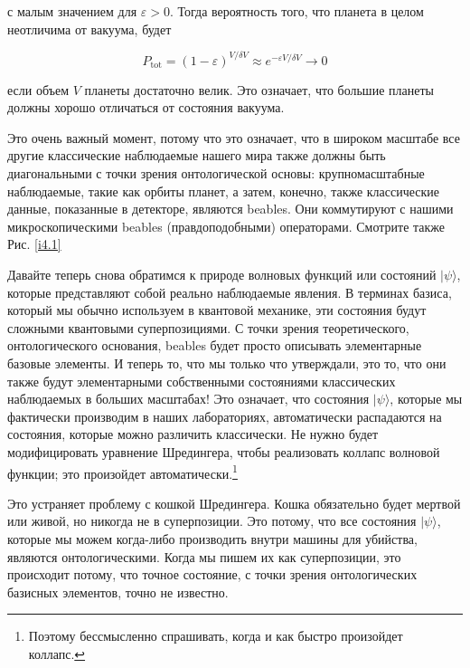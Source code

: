\documentclass[main.tex]{subfiles}
\begin{document}
с малым значением для $\varepsilon > 0$. Тогда вероятность того, что планета в целом неотличима от вакуума, будет

\begin{equation}\label{4.2}
	P_{\mathrm{tot}}=(1-\varepsilon)^{V / \delta V} \approx e^{-\varepsilon V / \delta V} \rightarrow 0
\end{equation}
            
если объем $V$ планеты достаточно велик. Это означает, что большие планеты должны хорошо отличаться от состояния вакуума.

Это очень важный момент, потому что это означает, что в широком масштабе все другие классические наблюдаемые нашего мира также должны быть диагональными с точки зрения онтологической основы: крупномасштабные наблюдаемые, такие как орбиты планет, а затем, конечно, также классические данные, показанные в детекторе, являются beables. Они коммутируют с нашими микроскопическими beables (правдоподобными) операторами. Смотрите также Рис. \ref{i4.1}

Давайте теперь снова обратимся к природе волновых функций или состояний $|\psi\rangle$, которые представляют собой реально наблюдаемые явления. В терминах базиса, который мы обычно используем в квантовой механике, эти состояния будут сложными квантовыми суперпозициями. С точки зрения теоретического, онтологического основания, beables будет просто описывать элементарные базовые элементы. И теперь то, что мы только что утверждали, это то, что они также будут элементарными собственными состояниями классических наблюдаемых в больших масштабах! Это означает, что состояния $|\psi\rangle$, которые мы фактически производим в наших лабораториях, автоматически распадаются на состояния, которые можно различить классически. Не нужно будет модифицировать уравнение Шредингера, чтобы реализовать коллапс волновой функции; это произойдет автоматически.\footnote{Поэтому бессмысленно спрашивать, когда и как быстро произойдет коллапс.}

Это устраняет проблему с кошкой Шредингера. Кошка обязательно будет мертвой или живой, но никогда не в суперпозиции. Это потому, что все состояния $|\psi\rangle$, которые мы можем когда-либо производить внутри машины для убийства, являются онтологическими. Когда мы пишем их как суперпозиции, это происходит потому, что точное состояние, с точки зрения онтологических базисных элементов, точно не известно.
\end{document}
